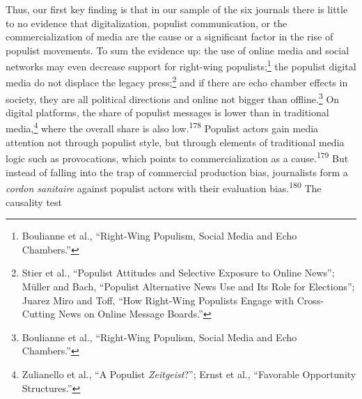 \documentclass{tufte-handout}
\begin{document}
{{{{Thus, our first key finding is that in our sample of the six journals
there is little to no evidence that digitalization, populist
communication, or the commercialization of media are the cause or a
significant factor in the rise of populist movements. To sum the
evidence up: the use of online media and social networks may even
decrease support for right-wing populists;\footnote{Boulianne et al.,
  ``Right-Wing Populism, Social Media and Echo Chambers.''} the populist
digital media do not displace the legacy press;\footnote{Stier et al.,
  ``Populist Attitudes and Selective Exposure to Online News''; Müller
  and Bach, ``Populist Alternative News Use and Its Role for
  Elections''; Juarez Miro and Toff, ``How Right-Wing Populists Engage
  with Cross-Cutting News on Online Message Boards.''} and if there are
echo chamber effects in society, they are all political directions and
online not bigger than offline.\footnote{Boulianne et al., ``Right-Wing
  Populism, Social Media and Echo Chambers.''} On digital platforms, the
share of populist messages is lower than in traditional
media,\footnote{Zulianello et al., ``A Populist \emph{Zeitgeist}?'';
  Ernst et al., ``Favorable Opportunity Structures.''} where the overall
share is also low.\textsuperscript{178}
Populist actors gain media attention not through populist style, but
through elements of traditional media logic such as provocations, which
points to commercialization as a cause.\textsuperscript{179} But instead of falling into the trap of commercial
production bias, journalists form a \emph{cordon sanitaire} against
populist actors with their evaluation bias.\textsuperscript{180} The causality test}}}}
\end{document}
